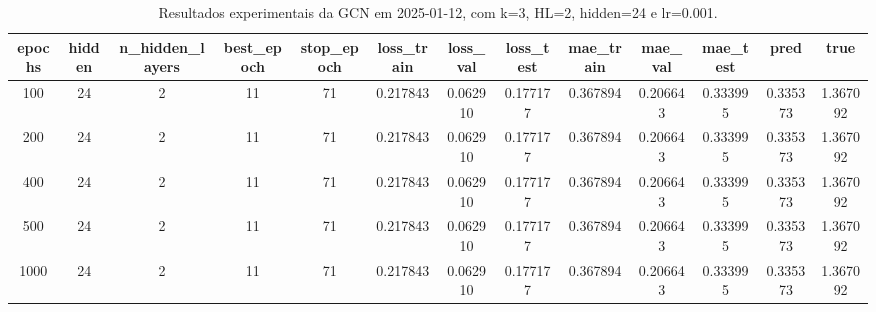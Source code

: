 \begin{table}[h]
\centering
\caption{Resultados experimentais da GCN em 2025-01-12, com k=3, HL=2, hidden=24 e lr=0.001.}
\label{tab:gcn_results_k3_hl2_h24_d20250112}
\begin{tabular}{ccccccccccccc}
\toprule
epochs & hidden & n\_hidden\_layers & best\_epoch & stop\_epoch & loss\_train & loss\_val & loss\_test & mae\_train & mae\_val & mae\_test & pred & true \\
\midrule
100 & 24 & 2 & 11 & 71 & 0.217843 & 0.062910 & 0.177177 & 0.367894 & 0.206643 & 0.333995 & 0.335373 & 1.367092 \\
200 & 24 & 2 & 11 & 71 & 0.217843 & 0.062910 & 0.177177 & 0.367894 & 0.206643 & 0.333995 & 0.335373 & 1.367092 \\
400 & 24 & 2 & 11 & 71 & 0.217843 & 0.062910 & 0.177177 & 0.367894 & 0.206643 & 0.333995 & 0.335373 & 1.367092 \\
500 & 24 & 2 & 11 & 71 & 0.217843 & 0.062910 & 0.177177 & 0.367894 & 0.206643 & 0.333995 & 0.335373 & 1.367092 \\
1000 & 24 & 2 & 11 & 71 & 0.217843 & 0.062910 & 0.177177 & 0.367894 & 0.206643 & 0.333995 & 0.335373 & 1.367092 \\
\bottomrule
\end{tabular}
\end{table}
